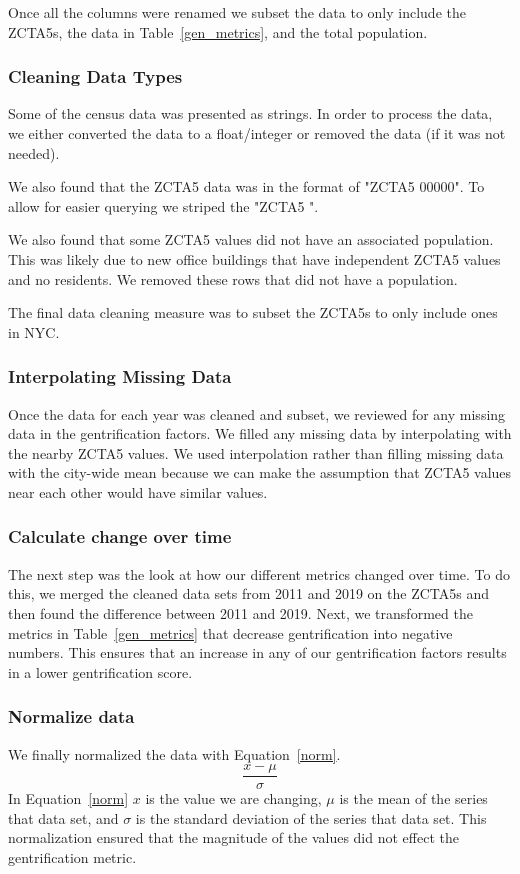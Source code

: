 \documentclass[conference]{IEEEtran}
\begin{document}
Once all the columns were renamed we subset the data to only include the ZCTA5s, the data in Table~\ref{gen_metrics}, and the total population.

\subsubsection{Cleaning Data Types}
Some of the census data was presented as strings. In order to process the data, we either converted the data to a float/integer or removed the data (if it was not needed).

We also found that the ZCTA5 data was in the format of "ZCTA5 00000". To allow for easier querying we striped the "ZCTA5 ".

We also found that some ZCTA5 values did not have an associated population. This was likely due to new office buildings that have independent ZCTA5 values and no residents. We removed these rows that did not have a population.

The final data cleaning measure was to subset the ZCTA5s to only include ones in NYC.

\subsubsection{Interpolating Missing Data}
Once the data for each year was cleaned and subset, we reviewed for any missing data in the gentrification factors. We filled any missing data by interpolating with the nearby ZCTA5 values. We used interpolation rather than filling missing data with the city-wide mean because we can make the assumption that ZCTA5 values near each other would have similar values.

\subsubsection{Calculate change over time}
The next step was the look at how our different metrics changed over time. To do this, we merged the cleaned data sets from 2011 and 2019 on the ZCTA5s and then found the difference between 2011 and 2019. Next, we transformed the metrics in Table~\ref{gen_metrics} that decrease gentrification into negative numbers. This ensures that an increase in any of our gentrification factors results in a lower gentrification score.

\subsubsection{Normalize data}
We finally normalized the data with Equation~\ref{norm}.
\begin{equation}
\frac{x-\mu}{\sigma}\label{norm}
\end{equation}
In Equation~\ref{norm} $x$ is the value we are changing, $\mu$ is the mean of the series that data set, and $\sigma$ is the standard deviation of the series that data set. This normalization ensured that the magnitude of the values did not effect the gentrification metric.
\end{document}
